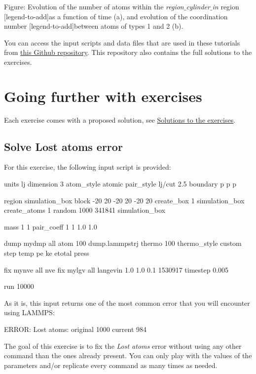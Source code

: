 \vspace{0.25cm} Figure: Evolution of the number of atoms within the \textit{region$\_$cylinder$\_$in} region
[legend-to-add]as a function of time (a), and evolution of the coordination number
[legend-to-add]between atoms of types 1 and 2 (b). 

\vspace{0.25cm} \noindent You can access the input scripts and data files that
are used in these tutorials from \href{https://github.com/lammpstutorials/lammpstutorials-inputs/}{this Github repository}.
This repository also contains the full solutions to the exercises.

\section{Going further with exercises}
\noindent Each exercise comes with a proposed solution, 
see \hyperref[solutions-label]{Solutions to the exercises}.

\subsection{Solve Lost atoms error}
\noindent For this exercise, the following input script is provided:

\begin{lcverbatim}
units lj
dimension 3
atom_style atomic
pair_style lj/cut 2.5
boundary p p p

region simulation_box block -20 20 -20 20 -20 20
create_box 1 simulation_box
create_atoms 1 random 1000 341841 simulation_box

mass 1 1
pair_coeff 1 1 1.0 1.0

dump mydmp all atom 100 dump.lammpstrj
thermo 100
thermo_style custom step temp pe ke etotal press

fix mynve all nve
fix mylgv all langevin 1.0 1.0 0.1 1530917
timestep 0.005

run 10000
\end{lcverbatim}

\noindent As it is, this input returns one of the most common
error that you will encounter using LAMMPS:

\begin{lcverbatim}
ERROR: Lost atoms: original 1000 current 984
\end{lcverbatim}

\noindent The goal of this exercise is to fix the \textit{Lost atoms} error without 
using any other command than the ones already present. You can 
only play with the values of the parameters and/or replicate every
command as many times as needed.

